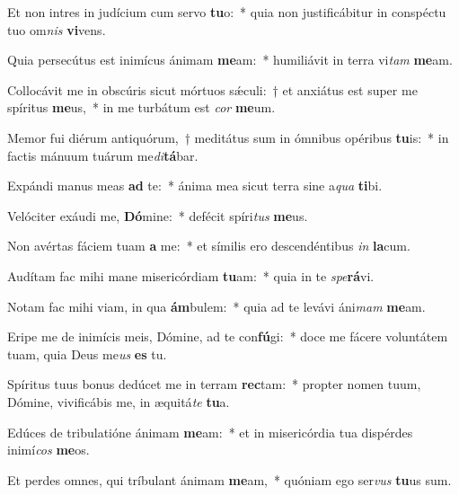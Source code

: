 \item Et non intres in judícium cum servo \textbf{tu}o:~* quia non justificábitur in conspéctu tuo om\textit{nis} \textbf{vi}vens.
\item Quia persecútus est inimícus ánimam \textbf{me}am:~* humiliávit in terra vi\textit{tam} \textbf{me}am.
\item Collocávit me in obscúris sicut mórtuos sǽculi:~† et anxiátus est super me spíritus \textbf{me}us,~* in me turbátum est \textit{cor} \textbf{me}um.
\item Memor fui diérum antiquórum,~† meditátus sum in ómnibus opéribus \textbf{tu}is:~* in factis mánuum tuárum me\textit{di}\textbf{tá}bar.
\item Expándi manus meas \textbf{ad} te:~* ánima mea sicut terra sine a\textit{qua} \textbf{ti}bi.
\item Velóciter exáudi me, \textbf{Dó}mine:~* defécit spíri\textit{tus} \textbf{me}us.
\item Non avértas fáciem tuam \textbf{a} me:~* et símilis ero descendéntibus \textit{in} \textbf{la}cum.
\item Audítam fac mihi mane misericórdiam \textbf{tu}am:~* quia in te \textit{spe}\textbf{rá}vi.
\item Notam fac mihi viam, in qua \textbf{ám}bulem:~* quia ad te levávi áni\textit{mam} \textbf{me}am.
\item Eripe me de inimícis meis, Dómine, ad te con\textbf{fú}gi:~* doce me fácere voluntátem tuam, quia Deus me\textit{us} \textbf{es} tu.
\item Spíritus tuus bonus dedúcet me in terram \textbf{rec}tam:~* propter nomen tuum, Dómine, vivificábis me, in æquitá\textit{te} \textbf{tu}a.
\item Edúces de tribulatióne ánimam \textbf{me}am:~* et in misericórdia tua dispérdes inimí\textit{cos} \textbf{me}os.
\item Et perdes omnes, qui tríbulant ánimam \textbf{me}am,~* quóniam ego ser\textit{vus} \textbf{tu}us sum.
